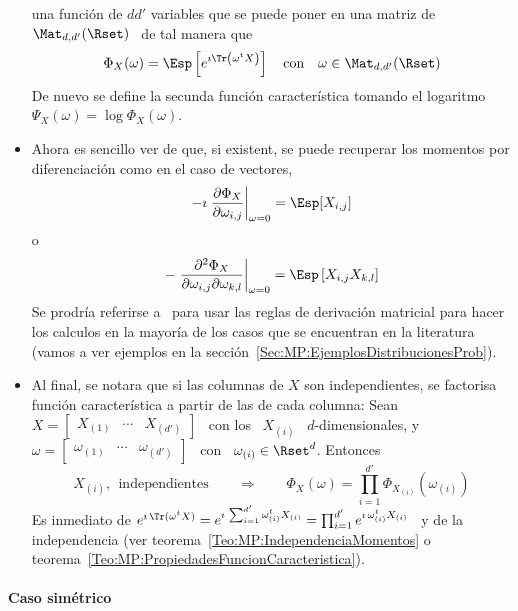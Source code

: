 \begin{itemize}
  una  funci\'on de  $d d'$  variables que  se puede  poner en  una matriz  de \
  $\Mat_{d,d'}(\Rset)$ \ de tal manera que
  \[
  \Phi_X(\omega) =  \Esp\left[ e^{\imath  \Tr\left( \omega^t X  \right)} \right]
  \quad \mbox{con} \quad \omega \in \Mat_{d,d'}(\Rset)
  \]
  De nuevo  se define la  secunda funci\'on caracter\'istica tomando  el logaritmo
  $\Psi_X(\omega) = \log \Phi_X(\omega)$.
%
\item Ahora es sencillo ver de que, si existent, se puede recuperar los momentos
  por  diferenciaci\'on   como  en  el  caso  de   vectores,
  \[
  -\imath \left. \frac{\partial \Phi_X}{\partial \omega_{i,j}} \right|_{\omega =
    0} = \Esp[X_{i,j}]
  \]
  o
  \[
  - \left. \frac{\partial^2 \Phi_X}{\partial \omega_{i,j} \partial \omega_{k,l}}
  \right|_{\omega = 0} = \Esp\left[ X_{i,j} X_{k,l} \right]
  \]
  Se  prodr\'ia  referirse a~\cite[Cap.~8]{MagNeu99}  para  usar  las reglas  de
  derivaci\'on matricial  para hacer los calculos  en la mayor\'ia  de los casos
  que   se  encuentran  en   la  literatura   (vamos  a   ver  ejemplos   en  la
  secci\'on~\ref{Sec:MP:EjemplosDistribucionesProb}).
%
\item Al  final, se  notara que si  las columnas  de $X$ son  independientes, se
  factorisa funci\'on caracter\'istica  a partir de las de  cada columna: Sean \
  $X =  \begin{bmatrix} X_{(1)} & \cdots  & X_{(d')} \end{bmatrix}$ \  con los \
  $X_{(i)}$ \  $d$-dimensionales, y \  $\omega = \begin{bmatrix}  \omega_{(1)} &
    \cdots   &  \omega_{(d')}   \end{bmatrix}$   \  con   \  $\omega_{(i)}   \in
  \Rset^d$. Entonces
    \[
    X_{(i)}, \:\: \mbox{independientes} \qquad \Rightarrow \qquad \Phi_X(\omega)
    = \prod_{i=1}^{d'} \Phi_{X_{(i)}}(\omega_{(i)})
  \]
  Es inmediato de $e^{\imath \,  \Tr(\omega^t X)} = e^{\imath \, \sum_{i=1}^{d'}
    \omega_{(i)}^t  X_{(i)}}  =  \prod_{i=1}^{d'}  e^{\imath  \,  \omega_{(i)}^t
    X_{(i)}}$       \        y       de       la        independencia       (ver
  teorema~\ref{Teo:MP:IndependenciaMomentos}                                    o
  teorema~\ref{Teo:MP:PropiedadesFuncionCaracteristica}).
%
\end{itemize}




\paragraph{Caso sim\'etrico}

